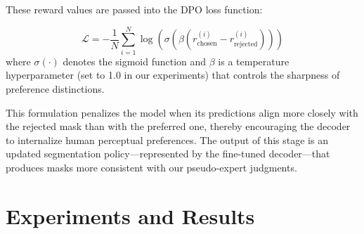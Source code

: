 \documentclass[11pt]{article}
\begin{document}
These reward values are passed into the DPO loss function:



\begin{equation}
\mathcal{L} = -\frac{1}{N} \sum_{i=1}^{N} \log \left( \sigma\left( \beta \left( r^{(i)}_{\text{chosen}} - r^{(i)}_{\text{rejected}} \right) \right) \right)
\end{equation}
where $\sigma(\cdot)$ denotes the sigmoid function and $\beta$ is a temperature hyperparameter (set to 1.0 in our experiments) that controls the sharpness of preference distinctions.

This formulation penalizes the model when its predictions align more closely with the rejected mask than with the preferred one, thereby encouraging the decoder to internalize human perceptual preferences. The output of this stage is an updated segmentation policy—represented by the fine-tuned decoder—that produces masks more consistent with our pseudo-expert judgments.


\section{Experiments and Results}
\end{document}
